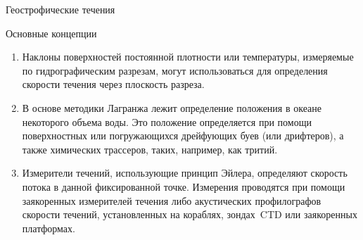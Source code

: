 \begin{chapter}{Геострофические течения}
\begin{section}{Основные концепции}
\begin{enumerate}
\item
Наклоны поверхностей постоянной плотности или температуры, измеряемые
по гидрографическим разрезам, могут использоваться для определения
скорости течения через плоскость разреза.
%

\item
В основе методики Лагранжа лежит определение положения в океане некоторого
объема воды. Это положение определяется при помощи поверхностных или 
погружающихся дрейфующих буев (или дрифтеров), а также
химических трассеров, таких, например, как тритий.
%

\item
Измерители течений, использующие принцип Эйлера, определяют скорость потока
в данной фиксированной точке. Измерения проводятся при помощи заякоренных
измерителей течения либо акустических профилографов скорости течений,
установленных на кораблях, зондах~CTD или заякоренных платформах.
%
\end{enumerate}
\end{section}

\end{chapter}